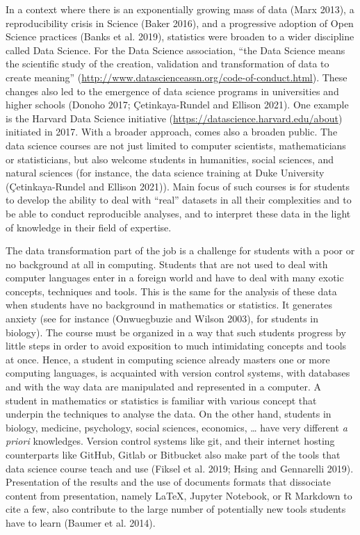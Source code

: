 \documentclass[
]{article}
\begin{document}
In a context where there is an exponentially growing mass of data (Marx
2013), a reproducibility crisis in Science (Baker 2016), and a
progressive adoption of Open Science practices (Banks et al. 2019),
statistics were broaden to a wider discipline called Data Science. For
the Data Science association, ``the Data Science means the scientific
study of the creation, validation and transformation of data to create
meaning'' (\url{http://www.datascienceassn.org/code-of-conduct.html}).
These changes also led to the emergence of data science programs in
universities and higher schools (Donoho 2017; Çetinkaya-Rundel and
Ellison 2021). One example is the Harvard Data Science initiative
(\url{https://datascience.harvard.edu/about}) initiated in 2017. With a
broader approach, comes also a broaden public. The data science courses
are not just limited to computer scientists, mathematicians or
statisticians, but also welcome students in humanities, social sciences,
and natural sciences (for instance, the data science training at Duke
University (Çetinkaya-Rundel and Ellison 2021)). Main focus of such
courses is for students to develop the ability to deal with ``real''
datasets in all their complexities and to be able to conduct
reproducible analyses, and to interpret these data in the light of
knowledge in their field of expertise.

The data transformation part of the job is a challenge for students with
a poor or no background at all in computing. Students that are not used
to deal with computer languages enter in a foreign world and have to
deal with many exotic concepts, techniques and tools. This is the same
for the analysis of these data when students have no background in
mathematics or statistics. It generates anxiety (see for instance
(Onwuegbuzie and Wilson 2003), for students in biology). The course must
be organized in a way that such students progress by little steps in
order to avoid exposition to much intimidating concepts and tools at
once. Hence, a student in computing science already masters one or more
computing languages, is acquainted with version control systems, with
databases and with the way data are manipulated and represented in a
computer. A student in mathematics or statistics is familiar with
various concept that underpin the techniques to analyse the data. On the
other hand, students in biology, medicine, psychology, social sciences,
economics, \ldots{} have very different \emph{a priori} knowledges.
Version control systems like git, and their internet hosting
counterparts like GitHub, Gitlab or Bitbucket also make part of the
tools that data science course teach and use (Fiksel et al. 2019; Hsing
and Gennarelli 2019). Presentation of the results and the use of
documents formats that dissociate content from presentation, namely
LaTeX, Jupyter Notebook, or R Markdown to cite a few, also contribute to
the large number of potentially new tools students have to learn (Baumer
et al. 2014).
\end{document}
